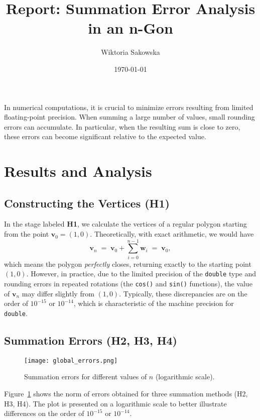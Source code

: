 \documentclass[a4paper,12pt]{article}
\title{Report: Summation Error Analysis in an n-Gon}
\author{Wiktoria Sakowska}
\date{\today}
\begin{document}
\maketitle

In numerical computations, it is crucial to minimize errors resulting from limited floating-point precision. When summing a large number of values, small rounding errors can accumulate. In particular, when the resulting sum is close to zero, these errors can become significant relative to the expected value.\\

\section{Results and Analysis}

\subsection{Constructing the Vertices (H1)}

In the stage labeled \textbf{H1}, we calculate the vertices of a regular polygon starting from the point \(\mathbf{v}_0 = (1,0)\).  
Theoretically, with exact arithmetic, we would have
\[
  \mathbf{v}_n \;=\; \mathbf{v}_0 + \sum_{i=0}^{n-1} \mathbf{w}_i \;=\; \mathbf{v}_0,
\]
which means the polygon \emph{perfectly} closes, returning exactly to the starting point \((1,0)\).  
However, in practice, due to the limited precision of the \texttt{double} type and rounding errors in repeated rotations (the \texttt{cos()} and \texttt{sin()} functions), the value of \(\mathbf{v}_n\) may differ slightly from \((1,0)\).  
Typically, these discrepancies are on the order of \(10^{-15}\) or \(10^{-14}\), which is characteristic of the machine precision for \texttt{double}.

\subsection{Summation Errors (H2, H3, H4)}
\begin{figure}[H]
    \centering
    \texttt{[image: global\_errors.png]}
    \caption{Summation errors for different values of \(n\) (logarithmic scale).}
    \label{fig:global_errors}
\end{figure}

Figure~\ref{fig:global_errors} shows the norm of errors obtained for three summation methods (H2, H3, H4). The plot is presented on a logarithmic scale to better illustrate differences on the order of \(10^{-15}\) or \(10^{-14}\). 
\end{document}
